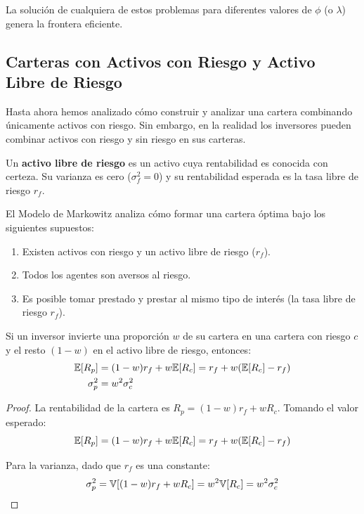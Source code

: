 La solución de cualquiera de estos problemas para diferentes valores de $\phi$ (o $\lambda$) genera la frontera eficiente.

\subsection{Carteras con Activos con Riesgo y Activo Libre de Riesgo}

Hasta ahora hemos analizado cómo construir y analizar una cartera combinando únicamente activos con riesgo. Sin embargo, en la realidad los inversores pueden combinar activos con riesgo y sin riesgo en sus carteras.

\begin{definicion}
Un \textbf{activo libre de riesgo} es un activo cuya rentabilidad es conocida con certeza. Su varianza es cero ($\sigma_f^2 = 0$) y su rentabilidad esperada es la tasa libre de riesgo $r_f$.
\end{definicion}

El Modelo de Markowitz analiza cómo formar una cartera óptima bajo los siguientes supuestos:
\begin{enumerate}
\item Existen activos con riesgo y un activo libre de riesgo ($r_f$).
\item Todos los agentes son aversos al riesgo.
\item Es posible tomar prestado y prestar al mismo tipo de interés (la tasa libre de riesgo $r_f$).
\end{enumerate}

\begin{teorema}
Si un inversor invierte una proporción $w$ de su cartera en una cartera con riesgo $c$ y el resto $(1-w)$ en el activo libre de riesgo, entonces:
\begin{align}
\mathbb{E}[R_p] &= (1-w)r_f + w\mathbb{E}[R_c] = r_f + w(\mathbb{E}[R_c] - r_f) \label{eq:ret_riskfree}\\
\sigma_p^2 &= w^2 \sigma_c^2 \label{eq:var_riskfree}
\end{align}
\end{teorema}

\begin{proof}
La rentabilidad de la cartera es $R_p = (1-w)r_f + wR_c$. Tomando el valor esperado:
$$\mathbb{E}[R_p] = (1-w)r_f + w\mathbb{E}[R_c] = r_f + w(\mathbb{E}[R_c] - r_f)$$

Para la varianza, dado que $r_f$ es una constante:
$$\sigma_p^2 = \mathbb{V}[(1-w)r_f + wR_c] = w^2 \mathbb{V}[R_c] = w^2 \sigma_c^2$$
\end{proof}

